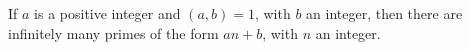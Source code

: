 \documentclass[12pt]{article}
\begin{document}
If $a$ is a positive integer and $(a,b)=1$, with $b$ an integer, then there are infinitely many primes of the form $an + b$, with $n$ an integer.
\end{document}
